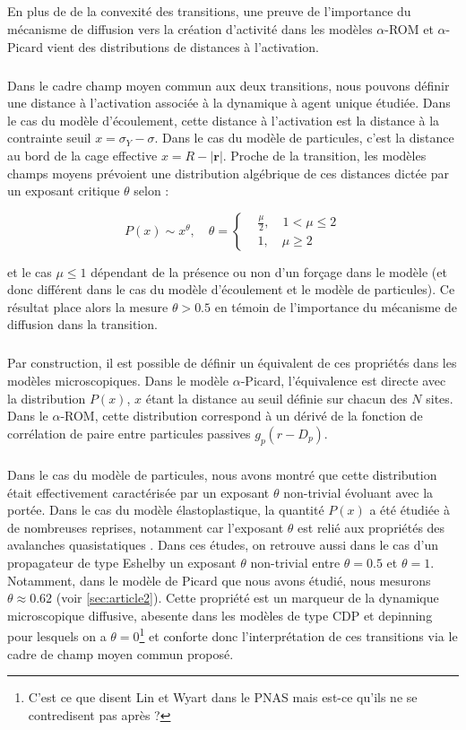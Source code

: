 \subparagraph{}En plus de de la convexité des transitions, une preuve de l'importance du mécanisme de diffusion vers la création d'activité dans les modèles $\alpha$-ROM et $\alpha$-Picard vient des distributions de distances à l'activation.

\subparagraph{}Dans le cadre champ moyen commun aux deux transitions, nous pouvons définir une distance à l'activation associée à la dynamique à agent unique étudiée. Dans le cas du modèle d'écoulement, cette distance à l'activation est la distance à la contrainte seuil $x = \sigma_Y - \sigma$. Dans le cas du modèle de particules, c'est la distance au bord de la cage effective $x = R-|\mathbf{r}|$. Proche de la transition, les modèles champs moyens prévoient une distribution algébrique de ces distances dictée par un exposant critique $\theta$ selon :

\begin{equation}
	P(x) \sim x^\theta, \quad \theta = \left\{
	\begin{aligned}
	&\frac{\mu}{2}, \quad 1 < \mu \leq 2\\
	&1, \quad \mu \geq 2
	\end{aligned}
	\right.
\end{equation}

\noindent et le cas $\mu \leq 1$ dépendant de la présence ou non d'un forçage dans le modèle \cite{lin_mean-field_2016} (et donc différent dans le cas du modèle d'écoulement et le modèle de particules). Ce résultat place alors la mesure $\theta > 0.5$ en témoin de l'importance du mécanisme de diffusion dans la transition.

\subparagraph{}Par construction, il est possible de définir un équivalent de ces propriétés dans les modèles microscopiques. Dans le modèle $\alpha$-Picard, l'équivalence est directe avec la distribution $P(x)$, $x$ étant la distance au seuil définie sur chacun des $N$ sites. Dans le $\alpha$-ROM, cette distribution correspond à un dérivé de la fonction de corrélation de paire entre particules passives $g_p(r - D_p)$.

\subparagraph{}Dans le cas du modèle de particules, nous avons montré que cette distribution était effectivement caractérisée par un exposant $\theta$ non-trivial évoluant avec la portée. Dans le cas du modèle élastoplastique, la quantité $P(x)$ a été étudiée à de nombreuses reprises, notamment car l'exposant $\theta$ est relié aux propriétés des avalanches quasistatiques \cite{lin_scaling_2014, ferrero_criticality_2019, liu_driving_2016, lin_mean-field_2016}. Dans ces études, on retrouve aussi dans le cas d'un propagateur de type Eshelby un exposant $\theta$ non-trivial entre $\theta = 0.5$ et $\theta = 1$. Notamment, dans le modèle de Picard que nous avons étudié, nous mesurons $\theta \approx 0.62$ (voir \autoref{sec:article2}). Cette propriété est un marqueur de la dynamique microscopique diffusive, abesente dans les modèles de type CDP et depinning pour lesquels on a $\theta = 0$\footnote{C'est ce que disent Lin et Wyart dans le PNAS mais est-ce qu'ils ne se contredisent pas après ?} et conforte donc l'interprétation de ces transitions via le cadre de champ moyen commun proposé.

